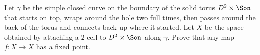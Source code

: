 Let $\gamma$ be the simple closed curve on the boundary of the solid
torus $D^2\times \Son$ that starts on top, wraps around the hole two
full times, then passes around the back of the torus and connects back
up where it started. Let $X$ be the space obtained by attaching a
$2$-cell to $D^2\times \Son$ along $\gamma$. Prove that any map
$f:X\rightarrow X$ has a fixed point.

